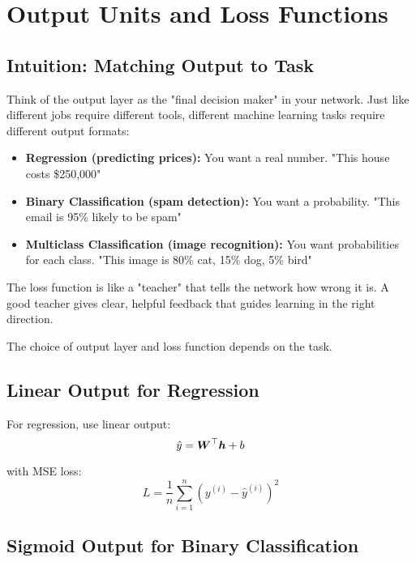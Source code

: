
\section{Output Units and Loss Functions }
\label{sec:output-loss}

\subsection{Intuition: Matching Output to Task}

Think of the output layer as the "final decision maker" in your network. Just like different jobs require different tools, different machine learning tasks require different output formats:

\begin{itemize}
    \item \textbf{Regression (predicting prices):} You want a real number. "This house costs \$250,000"
    \item \textbf{Binary Classification (spam detection):} You want a probability. "This email is 95\% likely to be spam"
    \item \textbf{Multiclass Classification (image recognition):} You want probabilities for each class. "This image is 80\% cat, 15\% dog, 5\% bird"
\end{itemize}

The loss function is like a "teacher" that tells the network how wrong it is. A good teacher gives clear, helpful feedback that guides learning in the right direction.

The choice of output layer and loss function depends on the task.

\subsection{Linear Output for Regression}

For regression, use linear output:
\begin{equation}
\hat{y} = \boldsymbol{W}^\top \boldsymbol{h} + b
\end{equation}

with MSE loss:
\begin{equation}
L = \frac{1}{n} \sum_{i=1}^{n} (y^{(i)} - \hat{y}^{(i)})^2
\end{equation}

\subsection{Sigmoid Output for Binary Classification}

